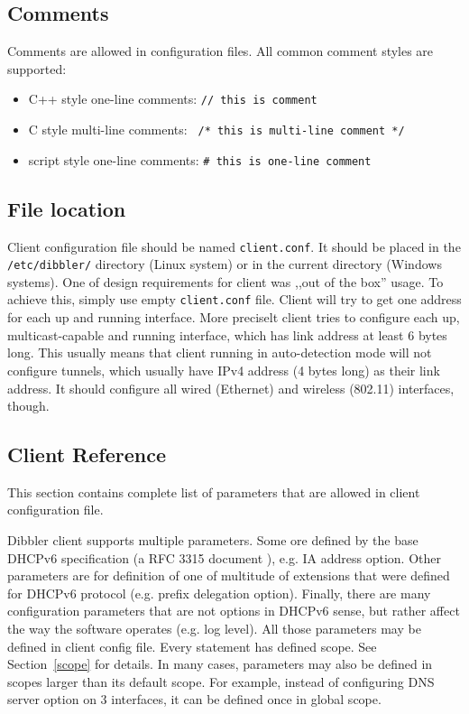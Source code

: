 \subsection{Comments}

Comments are allowed in configuration files. All common comment styles are supported:
\begin{itemize}
\item C++ style one-line comments: \verb+// this is comment+
\item C style multi-line comments: \verb+ /* this is multi-line comment */+
\item script style one-line comments: \verb+# this is one-line comment+
\end{itemize}

\subsection{File location}
\label{client-cfg-file}
Client configuration file should be named \verb+client.conf+. It
should be placed in the \verb+/etc/dibbler/+ directory (Linux system)
or in the current directory (Windows systems). One of design
requirements for client was ,,out of the box'' usage. To achieve this,
simply use empty \verb+client.conf+ file. Client will try to get one
address for each up and running interface. More preciselt client tries
to configure each up, multicast-capable and running interface, which
has link address at least 6 bytes long. This usually means that client
running in auto-detection mode will not configure tunnels, which
usually have IPv4 address (4 bytes long) as their link address. It
should configure all wired (Ethernet) and wireless (802.11)
interfaces, though.

\subsection{Client Reference}
\label{client-conf-reference}
This section contains complete list of parameters that are allowed in
client configuration file.

Dibbler client supports multiple parameters. Some ore defined by the
base DHCPv6 specification (a RFC 3315 document \cite{rfc3315}),
e.g. IA address option. Other parameters are for definition of one of
multitude of extensions that were defined for DHCPv6 protocol
(e.g. prefix delegation option). Finally, there are many configuration
parameters that are not options in DHCPv6 sense, but rather affect the
way the software operates (e.g. log level). All those parameters may
be defined in client config file. Every statement has defined
scope. See Section~\ref{scope} for details. In many cases, parameters
may also be defined in scopes larger than its default scope. For
example, instead of configuring DNS server option on 3 interfaces, it
can be defined once in global scope.

